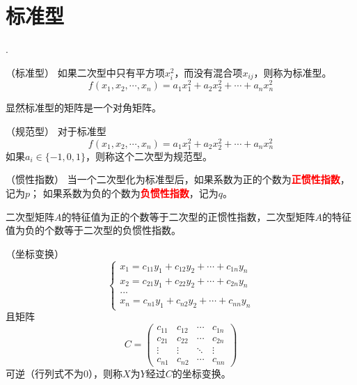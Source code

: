 \section{标准型}
.
\begin{definition}
    （标准型）
    如果二次型中只有平方项$x_i^2$，而没有混合项$x_{ij}$，则称为标准型。
    \[ f(x_1,x_2,\cdots,x_n) = a_1x_1^2 + a_2x_2^2 + \cdots + a_nx_n^2 \]
\end{definition}
显然标准型的矩阵是一个对角矩阵。

\begin{definition}
    （规范型）
    对于标准型
    \[ f(x_1,x_2,\cdots,x_n) = a_1x_1^2 + a_2x_2^2 + \cdots + a_nx_n^2 \]
    如果$a_i \in \{-1,0,1\}$，则称这个二次型为规范型。
\end{definition}

\begin{definition}
    （惯性指数）
    当一个二次型化为标准型后，如果系数为正的个数为\textcolor{red}{\textbf{\textsf{正惯性指数}}}，记为$p$；
    如果系数为负的个数为\textcolor{red}{\textbf{\textsf{负惯性指数}}}，记为$q$。
\end{definition}
\begin{theorem}
    二次型矩阵$A$的特征值为正的个数等于二次型的正惯性指数，二次型矩阵$A$的特征值为负的个数等于二次型的负惯性指数。
\end{theorem}

\begin{definition}
    （坐标变换）
    \[
        \begin{cases}
            x_1 = c_{11}y_1 + c_{12}y_2 + \cdots + c_{1n}y_n \\
            x_2 = c_{21}y_1 + c_{22}y_2 + \cdots + c_{2n}y_n \\
            ...                                              \\
            x_n = c_{n1}y_1 + c_{n2}y_2 + \cdots + c_{nn}y_n
        \end{cases}
    \]
    且矩阵
    \[
        C =
        \begin{pmatrix}
            c_{11} & c_{12} & \cdots & c_{1n} \\
            c_{21} & c_{22} & \cdots & c_{2n} \\
            \vdots & \vdots & \ddots & \vdots \\
            c_{n1} & c_{n2} & \cdots & c_{nn}
        \end{pmatrix}
    \]
    可逆（行列式不为$0$），则称$X$为$Y$经过$C$的坐标变换。
\end{definition}

